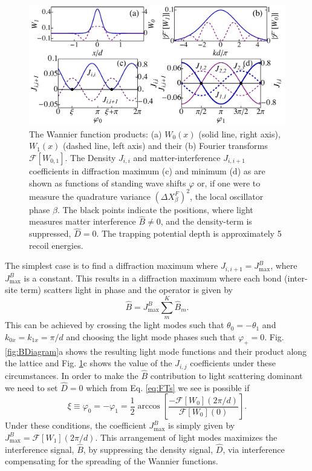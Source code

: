 \begin{figure}[hbtp!]
  \centering
  \includegraphics[width=\linewidth]{WF_S}
  \caption[Wannier Function Products]{The Wannier function products:
    (a) $W_0(x)$ (solid line, right axis), $W_1(x)$ (dashed line, left
    axis) and their (b) Fourier transforms $\mathcal{F}[W_{0,1}]$. The
    Density $J_{i,i}$ and matter-interference $J_{i,i+1}$ coefficients
    in diffraction maximum (c) and minimum (d) as are shown as
    functions of standing wave shifts $\varphi$ or, if one were to
    measure the quadrature variance $(\Delta X^F_\beta)^2$, the local
    oscillator phase $\beta$. The black points indicate the positions,
    where light measures matter interference $\hat{B} \ne 0$, and the
    density-term is suppressed, $\hat{D} = 0$. The trapping potential
    depth is approximately 5 recoil energies.}
  \label{fig:WannierProducts}
\end{figure}

The simplest case is to find a diffraction maximum where
$J_{i,i+1} = J^B_\mathrm{max}$, where $J^B_\mathrm{max}$ is a
constant. This results in a diffraction maximum where each bond
(inter-site term) scatters light in phase and the operator is given by
\begin{equation}
  \hat{B} = J^B_\mathrm{max} \sum_m^K \hat{B}_m .
\end{equation}
This can be achieved by crossing the light modes such that
$\theta_0 = -\theta_1$ and $k_{0x} = k_{1x} = \pi/d$ and choosing the
light mode phases such that $\varphi_+ = 0$. Fig. \ref{fig:BDiagram}a
shows the resulting light mode functions and their product along the
lattice and Fig. \ref{fig:WannierProducts}c shows the value of the
$J_{i,j}$ coefficients under these circumstances. In order to make the
$\hat{B}$ contribution to light scattering dominant we need to set
$\hat{D} = 0$ which from Eq. \eqref{eq:FTs} we see is possible if
\begin{equation}
  \xi \equiv \varphi_0 = -\varphi_1 =
  \frac{1}{2}\arccos\left[\frac{-\mathcal{F}[W_0](2\pi/d)}{\mathcal{F}[W_0](0)}\right].
\end{equation}
Under these conditions, the coefficient $J^B_\mathrm{max}$ is simply
given by $J^B_\mathrm{max} = \mathcal{F}[W_1](2 \pi / d)$. This
arrangement of light modes maximizes the interference signal,
$\hat{B}$, by suppressing the density signal, $\hat{D}$, via
interference compensating for the spreading of the Wannier functions.


